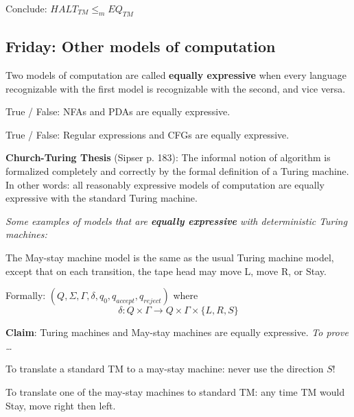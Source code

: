 \documentclass[12pt, oneside]{article}
\begin{document}
\vfill

Conclude: $HALT_{TM} \leq_m EQ_{TM}$
 

\newpage
\subsection*{Friday: Other models of computation}






Two models of computation are called {\bf equally expressive} when 
every language recognizable with the first model is recognizable with the second, and vice versa.

True / False: NFAs and PDAs are equally expressive.

True / False: Regular expressions and CFGs are equally expressive.


{\bf  Church-Turing Thesis} (Sipser p. 183): The informal notion of algorithm is formalized completely  and correctly by the 
formal definition of a  Turing machine. In other words: all reasonably expressive models of 
computation are equally expressive with the standard Turing machine.


\begin{center}
{\large \it  Some examples of models that are {\bf equally expressive} with deterministic Turing machines: }
\end{center}

\vfill

The May-stay machine model is the same as the usual Turing machine model,  except that
on each transition, the tape head may move L, move R, or Stay. 

Formally: $(Q, \Sigma, \Gamma, \delta, q_0, q_{accept}, q_{reject})$ where 
\[
  \delta: Q \times \Gamma \to Q \times \Gamma \times \{L, R, S\}
\]

{\bf Claim}: Turing machines and May-stay machines are equally expressive. {\it To prove \ldots}

To translate a standard TM to a may-stay machine: never use the direction $S$!


To translate one  of the  may-stay machines to standard TM:
any time TM would Stay, move right  then  left.

\begin{comment}
Formally: suppose $M_S =  (Q, \Sigma, \Gamma, \delta, q_0, q_{acc}, q_{rej})$
has $\delta: Q \times \Gamma \to Q \times \Gamma \times \{L, R, S\}$. Define
the Turing-machine
\[
  M_{new} =  (\phantom{\hspace{2.5in}})
\]

\vfill


\phantom{$M_{new}$ construction here \vspace{400pt}}
\vfill
\end{comment}
\end{document}

